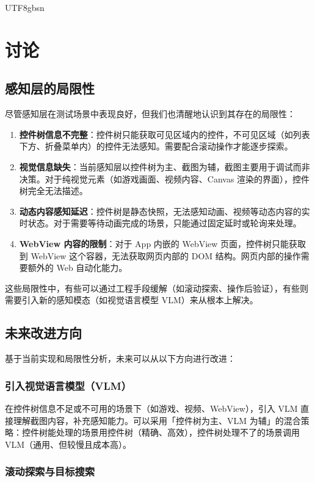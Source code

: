 \documentclass{article}
\begin{document}
\begin{CJK}{UTF8}{gbsn}
\section{讨论}
\label{sec:discussion}

\subsection{感知层的局限性}

尽管感知层在测试场景中表现良好，但我们也清醒地认识到其存在的局限性：

\begin{enumerate}[leftmargin=1.5em]
  \item \textbf{控件树信息不完整}：控件树只能获取可见区域内的控件，不可见区域（如列表下方、折叠菜单内）的控件无法感知。需要配合滚动操作才能逐步探索。
  \item \textbf{视觉信息缺失}：当前感知层以控件树为主、截图为辅，截图主要用于调试而非决策。对于纯视觉元素（如游戏画面、视频内容、Canvas 渲染的界面），控件树完全无法描述。
  \item \textbf{动态内容感知延迟}：控件树是静态快照，无法感知动画、视频等动态内容的实时状态。对于需要等待动画完成的场景，只能通过固定延时或轮询来处理。
  \item \textbf{WebView 内容的限制}：对于 App 内嵌的 WebView 页面，控件树只能获取到 WebView 这个容器，无法获取网页内部的 DOM 结构。网页内部的操作需要额外的 Web 自动化能力。
\end{enumerate}

这些局限性中，有些可以通过工程手段缓解（如滚动探索、操作后验证），有些则需要引入新的感知模态（如视觉语言模型 VLM）来从根本上解决。

\subsection{未来改进方向}

基于当前实现和局限性分析，未来可以从以下方向进行改进：

\subsubsection{引入视觉语言模型（VLM）}

在控件树信息不足或不可用的场景下（如游戏、视频、WebView），引入 VLM 直接理解截图内容，补充感知能力。可以采用「控件树为主、VLM 为辅」的混合策略：控件树能处理的场景用控件树（精确、高效），控件树处理不了的场景调用 VLM（通用、但较慢且成本高）。

\subsubsection{滚动探索与目标搜索}


\end{CJK}
\end{document}
